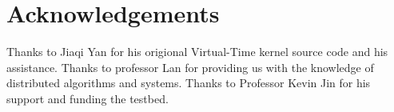 \documentclass{sig-alternate-05-2015}
\begin{document}



\section{Acknowledgements}
Thanks to Jiaqi Yan for his origional Virtual-Time kernel source code and his assistance. Thanks to professor Lan for providing us with the knowledge of distributed algorithms and systems. Thanks to Professor Kevin Jin for his support and funding the testbed.

%

%
%


\end{document}
